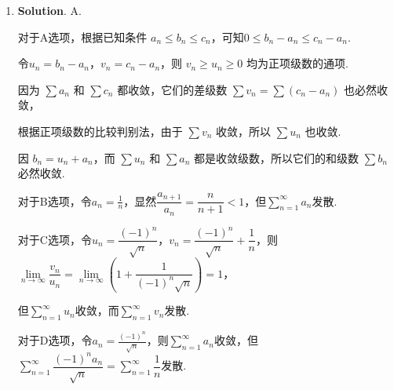 \documentclass[../main.tex]{subfiles}
\begin{document}
\begin{enumerate}
        用球坐标代换，$\mathrm{d}S=R^2\sin\varphi\,\mathrm{d}\varphi\,\mathrm{d}\theta$，因此
        \[
          \begin{aligned}
            c \iint\limits_{S} z\,\mathrm{d}S= {} & c \int_0^{2\pi}\mathrm{d}\theta\int_0^{\frac{\pi}{2}} R\cos\varphi R^2\sin\varphi\,\mathrm{d}\varphi \\
            = {}                                  & c\pi R^3\int_0^{\frac{\pi}{2}} \sin 2\varphi\,\mathrm{d}\varphi                                      \\
            = {}                                  & c\pi R^3\left[-\frac{\cos 2\varphi}{2}\right]_0^{\frac{\pi}{2}}                                      \\
            = {}                                  & c\pi R^3.
          \end{aligned}
        \]

  \item \textbf{Solution}. A.

        对于A选项，根据已知条件 $a_n \leq b_n \leq c_n$，可知$0 \leq b_n - a_n \leq c_n - a_n$.

        令$u_n = b_n - a_n$，$v_n = c_n - a_n$，则 $v_n \geq u_n \geq 0$ 均为正项级数的通项.

        因为 $\sum a_n$ 和 $\sum c_n$ 都收敛，它们的差级数 $\sum v_n = \sum (c_n - a_n)$ 也必然收敛，

        根据正项级数的比较判别法，由于 $\sum v_n$ 收敛，所以 $\sum u_n$ 也收敛.

        因 $b_n = u_n + a_n$，而 $\sum u_n$ 和 $\sum a_n$ 都是收敛级数，所以它们的和级数 $\sum b_n$ 必然收敛.

        对于B选项，令$a_n=\frac{1}{n}$，显然$\dfrac{a_{n+1}}{a_n}=\dfrac{n}{n+1}<1$，但$\sum\limits_{n=1}^{\infty} a_n$发散.

        对于C选项，令$u_n = \dfrac{(-1)^n}{\sqrt{n}}$，$v_n = \dfrac{(-1)^n}{\sqrt{n}} + \dfrac{1}{n}$，则$\lim \limits_{n \to \infty} \dfrac{v_n}{u_n} = \lim \limits_{n \to \infty} \left( 1 + \dfrac{1}{(-1)^n \sqrt{n}} \right) = 1$，

        但$\sum\limits_{n=1}^{\infty} u_n$收敛，而$\sum\limits_{n=1}^{\infty} v_n$发散.

        对于D选项，令$a_n = \frac{(-1)^n}{\sqrt{n}}$，则$\sum\limits_{n=1}^{\infty} a_n$收敛，但$\sum\limits_{n=1}^{\infty} \dfrac{(-1)^n a_n}{\sqrt{n}} = \sum\limits_{n=1}^{\infty} \dfrac{1}{n}$发散.

\end{enumerate}
\end{document}
